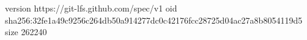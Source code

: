 version https://git-lfs.github.com/spec/v1
oid sha256:32fe1a49c9256c264db50a914277dc0c42176fcc28725d04ac27a8b8054119d5
size 262240
